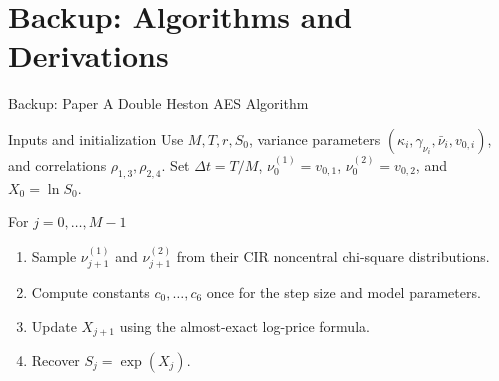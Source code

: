 \section*{Backup: Algorithms and Derivations}

\begin{frame}{Backup: Paper A Double Heston AES Algorithm}
  \scriptsize
  \begin{block}{Inputs and initialization}
    Use \(M,T,r,S_0\), variance parameters \((\kappa_i,\gamma_{\nu_i},\bar\nu_i,v_{0,i})\), and correlations \(\rho_{1,3},\rho_{2,4}\). Set \(\Delta t=T/M\), \(\nu_0^{(1)}=v_{0,1}\), \(\nu_0^{(2)}=v_{0,2}\), and \(X_0=\ln S_0\).
  \end{block}
  \begin{block}{For \(j=0,\ldots,M-1\)}
    \begin{enumerate}
      \item Sample \(\nu_{j+1}^{(1)}\) and \(\nu_{j+1}^{(2)}\) from their CIR noncentral chi-square distributions.
      \item Compute constants \(c_0,\ldots,c_6\) once for the step size and model parameters.
      \item Update \(X_{j+1}\) using the almost-exact log-price formula.
      \item Recover \(S_j=\exp(X_j)\).
    \end{enumerate}
  \end{block}
\end{frame}

